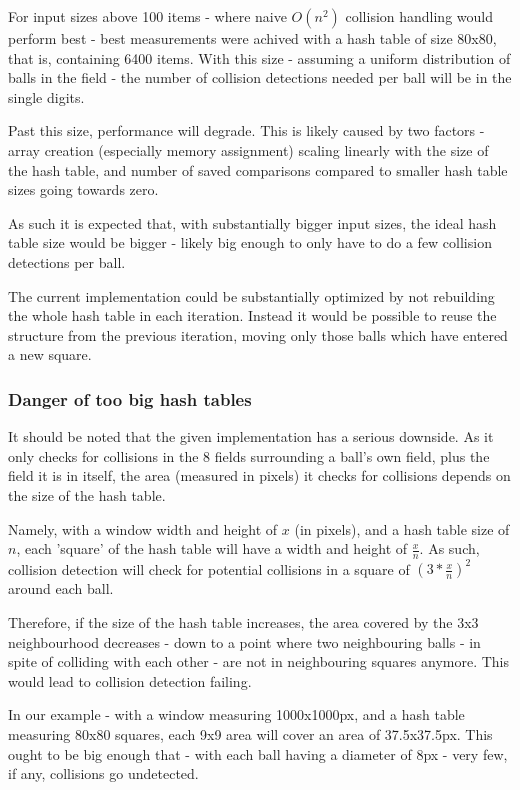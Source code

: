 \documentclass[a4paper]{scrartcl}
\begin{document}
For input sizes above 100 items - where naive $O(n^2)$ collision handling would
perform best - best measurements were achived with a hash table of size 80x80,
that is, containing 6400 items. With this size - assuming a uniform
distribution of balls in the field - the number of collision detections needed
per ball will be in the single digits.

Past this size, performance will degrade. This is likely caused by two factors
- array creation (especially memory assignment) scaling linearly with the size
of the hash table, and number of saved comparisons compared to smaller hash
table sizes going towards zero.

As such it is expected that, with substantially bigger input sizes, the ideal
hash table size would be bigger - likely big enough to only have to do a few
collision detections per ball.

The current implementation could be substantially optimized by not rebuilding
the whole hash table in each iteration. Instead it would be possible to reuse
the structure from the previous iteration, moving only those balls which have
entered a new square.

\subsubsection{Danger of too big hash tables}

It should be noted that the given implementation has a serious downside. As it
only checks for collisions in the 8 fields surrounding a ball's own field, plus
the field it is in itself, the area (measured in pixels) it checks for
collisions depends on the size of the hash table.

Namely, with a window width and height of $x$ (in pixels), and a hash table
size of $n$, each 'square' of the hash table will have a width and height of
$\frac{x}{n}$. As such, collision detection will check for potential collisions
in a square of $(3 * \frac{x}{n})^2$ around each ball.

Therefore, if the size of the hash table increases, the area covered by the 3x3
neighbourhood decreases - down to a point where two neighbouring balls - in
spite of colliding with each other - are not in neighbouring squares anymore.
This would lead to collision detection failing.

In our example - with a window measuring 1000x1000px, and a hash table
measuring 80x80 squares, each 9x9 area will cover an area of 37.5x37.5px. This
ought to be big enough that - with each ball having a diameter of 8px - very
few, if any, collisions go undetected.
\end{document}
